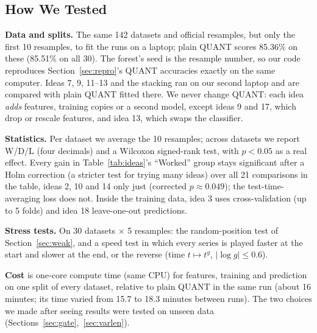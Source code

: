 \documentclass[conference]{IEEEtran}
\begin{document}
\subsection{How We Tested}
\label{sec:setup}
\textbf{Data and splits.} The same 142 datasets and official resamples, but only the first 10 resamples, to fit the runs on a laptop; plain QUANT scores 85.36\% on these (85.51\% on all 30). The forest's seed is the resample number, so our code reproduces Section~\ref{sec:repro}'s QUANT accuracies exactly on the same computer. Ideas 7, 9, 11--13 and the stacking ran on our second laptop and are compared with plain QUANT fitted there. We never change QUANT: each idea \emph{adds} features, training copies or a second model, except ideas 9 and 17, which drop or rescale features, and idea 13, which swaps the classifier.

\textbf{Statistics.} Per dataset we average the 10 resamples; across datasets we report W/D/L (four decimals) and a Wilcoxon signed-rank test, with $p<0.05$ as a real effect. Every gain in Table~\ref{tab:ideas}'s ``Worked'' group stays significant after a Holm correction (a stricter test for trying many ideas) over all 21 comparisons in the table, ideas 2, 10 and 14 only just (corrected $p\approx0.049$); the test-time-averaging loss does not. Inside the training data, idea 3 uses cross-validation (up to 5 folds) and idea 18 leave-one-out predictions.

\textbf{Stress tests.} On 30 datasets $\times$ 5 resamples: the random-position test of Section~\ref{sec:weak}, and a speed test in which every series is played faster at the start and slower at the end, or the reverse (time $t \mapsto t^g$, $|\log g| \le 0.6$).

\textbf{Cost} is one-core compute time (same CPU) for features, training and prediction on one split of every dataset, relative to plain QUANT in the same run (about 16 minutes; its time varied from 15.7 to 18.3 minutes between runs). The two choices we made after seeing results were tested on unseen data (Sections~\ref{sec:gate},~\ref{sec:varlen}).
\end{document}
